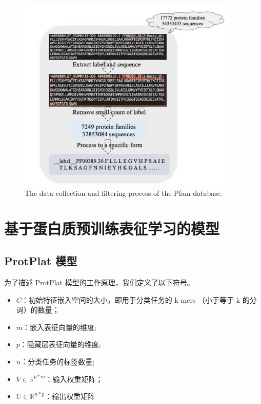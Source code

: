 \begin{figure}[!htp] 
\centering
\includegraphics[width=0.95\textwidth]  {imgs/data-process.png}
        {The data collection and filtering process of the Pfam database.}
\label{fig:data-process}
\end{figure}

\section{基于蛋白质预训练表征学习的模型}
\subsection{ProtPlat 模型}
为了描述 ProtPlat 模型的工作原理，我们定义了以下符号。

\begin{itemize}
    \item $C$：初始特征嵌入空间的大小，即用于分类任务的 k-mers （小于等于 k 的分词）的数量；
    \item $m$：嵌入表征向量的维度;
    \item $p$：隐藏层表征向量的维度;
    \item $n$：分类任务的标签数量;
    \item $V \in \mathbb{R}^{p*m}$：输入权重矩阵；
    \item $U \in \mathbb{R}^{n*p}$：输出权重矩阵
\end{itemize}

